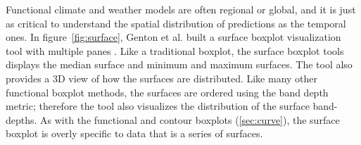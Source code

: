 \documentclass[../main.tex]{subfiles}
\begin{document}
Functional climate and weather models are often regional or global, and it is just as critical to understand the spatial distribution of predictions as the temporal ones. In figure~\ref{fig:surface}, Genton et al. built a surface boxplot visualization tool with multiple panes \cite{genton_surface_2014}. Like a traditional boxplot, the surface boxplot tools displays the median surface and minimum and maximum surfaces. The tool also provides a 3D view of how the surfaces are distributed. Like many other functional boxplot methods, the surfaces are ordered using the band depth metric; therefore the tool also visualizes the distribution of the surface band-depths. As with the functional and contour boxplots (\ref{sec:curve}), the surface boxplot is overly specific to data that is a series of surfaces. 
\end{document}
